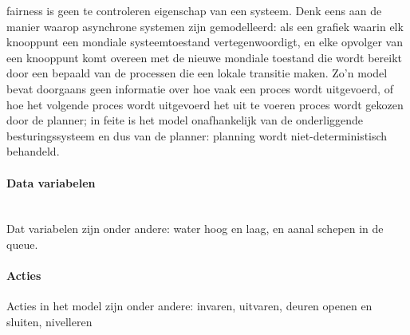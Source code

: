 \documentclass{article}
\begin{document}
	fairness   is geen te controleren eigenschap van een systeem. Denk eens aan de manier waarop asynchrone systemen zijn
	gemodelleerd: als een grafiek waarin elk knooppunt een mondiale systeemtoestand vertegenwoordigt, en elke opvolger van een knooppunt
	komt overeen met de nieuwe mondiale toestand die wordt bereikt door een bepaald van de processen die een lokale transitie maken.
	Zo’n model bevat doorgaans geen informatie over hoe vaak een proces wordt uitgevoerd, of hoe het volgende proces wordt uitgevoerd
	het uit te voeren proces wordt gekozen door de planner; in feite is het model onafhankelijk van de onderliggende
	besturingssysteem en dus van de planner: planning wordt niet-deterministisch behandeld.
	\cite{WahlFairness}
	
	
	
	
	\paragraph{Data variabelen} \\
	Dat variabelen zijn onder andere: water hoog  en laag, en aanal schepen in de queue.
	\paragraph{Acties}
	Acties in het model zijn onder andere: invaren, uitvaren, deuren openen en sluiten, nivelleren
	
 
%	
%	
\end{document}
